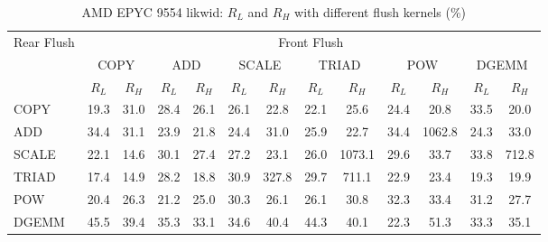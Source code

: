 \begin{table}[htbp]
\centering
\caption{AMD EPYC 9554 likwid: $R_L$ and $R_H$ with different flush kernels (\%)}
\label{tab:frkern-camd9554n2-likwid}
\begin{tabular*}{\textwidth}{@{\extracolsep{\fill}}lcccccccccccc}
\toprule
\multirow{3}{*}{Rear Flush} & \multicolumn{12}{c}{Front Flush} \\ \cmidrule(lr){2-13}
& \multicolumn{2}{c}{COPY} & \multicolumn{2}{c}{ADD} & \multicolumn{2}{c}{SCALE} & \multicolumn{2}{c}{TRIAD} & \multicolumn{2}{c}{POW} & \multicolumn{2}{c}{DGEMM} \\ \cmidrule(lr){2-3} \cmidrule(lr){4-5} \cmidrule(lr){6-7} \cmidrule(lr){8-9} \cmidrule(lr){10-11} \cmidrule(lr){12-13}
& $R_L$ & $R_H$ & $R_L$ & $R_H$ & $R_L$ & $R_H$ & $R_L$ & $R_H$ & $R_L$ & $R_H$ & $R_L$ & $R_H$ \\ \midrule
COPY & 19.3 & 31.0 & 28.4 & 26.1 & 26.1 & 22.8 & 22.1 & 25.6 & 24.4 & 20.8 & 33.5 & 20.0 \\
ADD & 34.4 & 31.1 & 23.9 & 21.8 & 24.4 & 31.0 & 25.9 & 22.7 & 34.4 & 1062.8 & 24.3 & 33.0 \\
SCALE & 22.1 & 14.6 & 30.1 & 27.4 & 27.2 & 23.1 & 26.0 & 1073.1 & 29.6 & 33.7 & 33.8 & 712.8 \\
TRIAD & 17.4 & 14.9 & 28.2 & 18.8 & 30.9 & 327.8 & 29.7 & 711.1 & 22.9 & 23.4 & 19.3 & 19.9 \\
POW & 20.4 & 26.3 & 21.2 & 25.0 & 30.3 & 26.1 & 26.1 & 30.8 & 32.3 & 33.4 & 31.2 & 27.7 \\
DGEMM & 45.5 & 39.4 & 35.3 & 33.1 & 34.6 & 40.4 & 44.3 & 40.1 & 22.3 & 51.3 & 33.3 & 35.1 \\
\bottomrule
\end{tabular*}
\end{table}